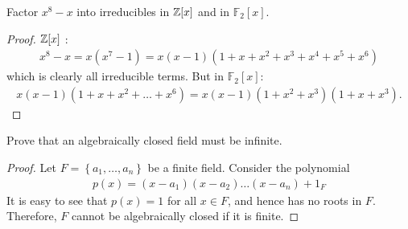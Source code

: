 \documentclass[num=12,duedate=04-28-21,course=Algebra\ II,proflastname=Walton]{hwtemplate}
\begin{document}

% 

\maketitle
\pagebreak
\problem[1]
\begin{claim} %
	Factor \(x^{8}-x\) into irreducibles in \(\mathbb{Z}[x]\) and in \(\mathbb{F}_2[x]\).
\end{claim}

\begin{proof}
	\(\mathbb{Z}[x]\) :
	\begin{align*}
		x^{8}-x = x(x^{7}-1) = x(x-1)(1+x+x^2+x^3+x^{4}+x^{5}+x^{6})
	\end{align*}
	which is clearly all irreducible terms. But in \(\mathbb{F}_2[x]\):
	\begin{align*}
		x(x-1)(1+x+x^2+\ldots+x^{6}) = x(x-1)(1+x^2+x^3)(1+x+x^3).
	\end{align*}
\end{proof}

\problem[2]

\begin{claim} %
	Prove that an algebraically closed field must be infinite.
\end{claim}

\begin{proof}
	Let \(F = \left\{a_1,\ldots,a_n \right\} \) be a finite field. Consider the polynomial
	\begin{align*}
		p(x) = (x-a_1)(x-a_2)\ldots(x-a_n)+ 1_F
	\end{align*}
	It is easy to see that \(p(x) = 1\) for all \(x \in F\), and hence has no roots in \(F\). Therefore, \(F\) cannot be algebraically closed if it is finite.
\end{proof}

\problem[3]
\end{document}
